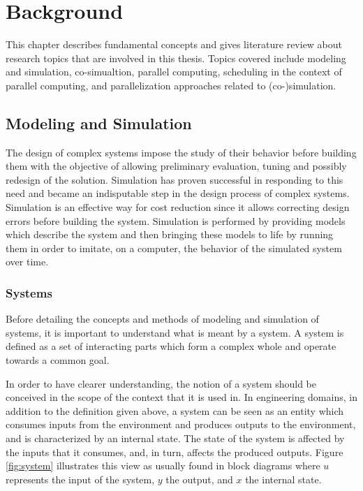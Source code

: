 \chapter{\label{ch:2-bkgnd}Background}

\minitoc

This chapter describes fundamental concepts and gives literature review about research topics that are involved in this thesis. Topics covered include modeling and simulation, co-simualtion, parallel computing, scheduling in the context of parallel computing, and parallelization approaches related to (co-)simulation. 

\section{\label{sec:MnS}Modeling and Simulation}

The design of complex systems impose the study of their behavior before building them with the objective of allowing preliminary evaluation, tuning and possibly redesign of the solution. Simulation has proven successful in responding to this need and became an indisputable step in the design process of complex systems. Simulation is an effective way for cost reduction since it allows correcting design errors before building the system. Simulation is performed by providing models which describe the system and then bringing these models to life by running them in order to imitate, on a computer, the behavior of the simulated system over time.   

\subsection{Systems}

Before detailing the concepts and methods of modeling and simulation of systems, it is important to understand what is meant by a system. A system is defined as a set of interacting parts which form a complex whole and operate towards a common goal. 

In order to have clearer understanding, the notion of a system should be conceived in the scope of the context that it is used in. In engineering domains, in addition to the definition given above, a system can be seen as an entity which consumes inputs from the environment and produces outputs to the environment, and is characterized by an internal state. The state of the system is affected by the inputs that it consumes, and, in turn, affects the produced outputs. Figure \ref{fig:system} illustrates this view as usually found in block diagrams where $u$ represents the input of the system, $y$ the output, and $x$ the internal state.

